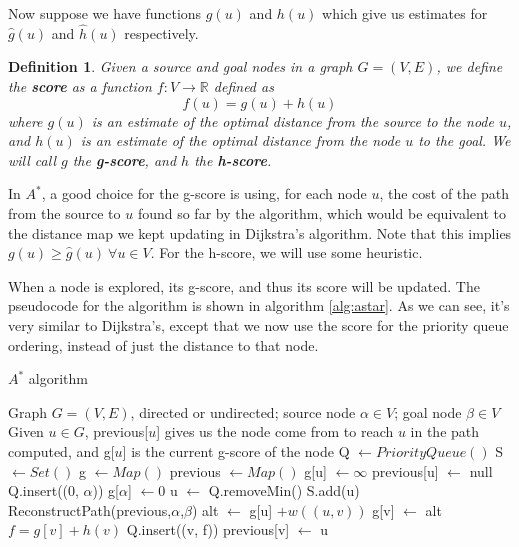 \documentclass[12pt]{report}
\newtheorem{definition}[theorem]{Definition}
\begin{document}
Now suppose we have functions $g(u)$ and $h(u)$ which give us estimates for $\hat{g}(u)$ and $\hat{h}(u)$ respectively.

\begin{definition}
Given a source and goal nodes in a graph $G = (V, E)$, we define the \textbf{score} as a function $f \colon V \to \mathbb{R}$ defined as
\begin{equation}
	f(u) = g(u) + h(u)
\end{equation}
where $g(u)$ is an estimate of the optimal distance from the source to the node $u$, and $h(u)$ is an estimate of the optimal distance from the node $u$ to the goal.
We will call $g$ the \textbf{g-score}, and $h$ the \textbf{h-score}.
\end{definition}

In $A^*$, a good choice for the g-score is using, for each node $u$, the cost of the path from the source to $u$ found so far by the algorithm, which would be equivalent to the distance map we kept updating in Dijkstra's algorithm. Note that this implies $g(u) \geq \hat{g}(u) \ \forall u \in V$. For the h-score, we will use some heuristic.

When a node is explored, its g-score, and thus its score will be updated. The pseudocode for the algorithm is shown in algorithm \ref{alg:astar}. As we can see, it's very similar to Dijkstra's, except that we now use the score for the priority queue ordering, instead of just the distance to that node.

\begin{algorithm}
\caption{$A^*$ algorithm}
\label{alg:astar}
\begin{algorithmic}[1]
\Require Graph $G = (V, E)$, directed or undirected; source node $\alpha \in V$; goal node $\beta \in V$
\Ensure Given $u \in G$, previous[$u$] gives us the node come from to reach $u$ in the path computed, and g[$u$] is the current g-score of the node
\State Q $\gets PriorityQueue()$
\State S $\gets Set()$
\State g $\gets Map()$
\State previous $\gets Map()$
	\State g[u] $\gets \infty$
	\State previous[u] $\gets$ null
\EndFor
\State Q.insert((0, $\alpha$))
\State g[$\alpha$] $\gets 0$
	\State u $\gets$ Q.removeMin()
	\State S.add(u)
	 
		\State \Return ReconstructPath(previous,$\alpha$,$\beta$)
	\EndIf
			\Continue {}
		\EndIf
		\State alt $\gets$ g[u] $+ w((u, v))$
			\State g[v] $\gets$ alt 
			\State $f = g[v] + h(v)$
			\State Q.insert((v, f))
			\State previous[v] $\gets$ u
		\EndIf
	\EndFor
\EndWhile
\EndProcedure
\end{algorithmic}
\end{algorithm}
\end{document}
